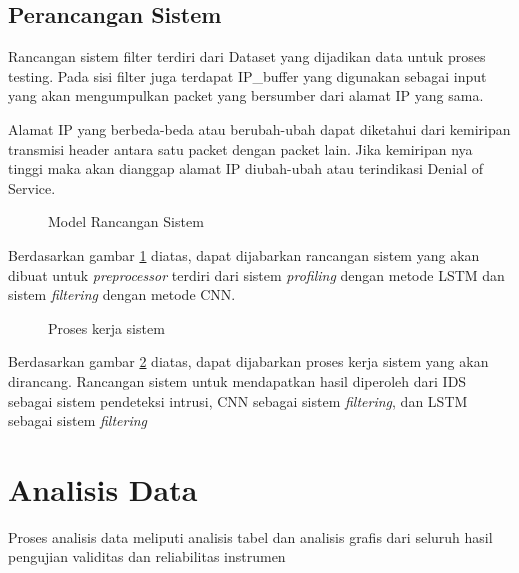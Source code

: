 \documentclass[./skripsi.tex]{subfiles}
\begin{document}
\subsection{Perancangan Sistem}
\par Rancangan sistem filter terdiri dari Dataset yang dijadikan data untuk proses testing. Pada sisi filter juga terdapat IP\_buffer yang digunakan sebagai input yang akan mengumpulkan packet yang bersumber dari alamat IP yang sama.
\par Alamat IP yang berbeda-beda atau berubah-ubah dapat diketahui dari kemiripan transmisi header antara satu packet dengan packet lain. Jika kemiripan nya tinggi maka akan dianggap alamat IP diubah-ubah atau terindikasi Denial of Service.

\begin{figure}[H]
    \centering
    \caption{Model Rancangan Sistem}
    \label{fig:rancanganpenelitian}
\end{figure}

\par Berdasarkan gambar \ref{fig:rancanganpenelitian} diatas, dapat dijabarkan rancangan sistem yang akan dibuat untuk \textit{preprocessor} terdiri dari sistem \textit{profiling} dengan metode LSTM dan sistem \textit{filtering} dengan metode CNN.

\begin{figure}[H]
    \centering
    \caption{Proses kerja sistem}
    \label{fig:proseskerjasistem}
\end{figure}

\par Berdasarkan gambar \ref{fig:proseskerjasistem} diatas, dapat dijabarkan proses kerja sistem yang akan dirancang. Rancangan sistem untuk mendapatkan hasil diperoleh dari IDS sebagai sistem pendeteksi intrusi, CNN sebagai sistem \textit{filtering}, dan LSTM sebagai sistem \textit{filtering}
\section{Analisis Data}
\par Proses analisis data meliputi analisis tabel dan analisis grafis dari seluruh hasil pengujian validitas dan reliabilitas instrumen
\end{document}
